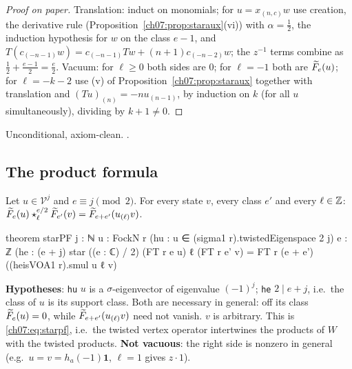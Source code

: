 \begin{proof}[Proof on paper]
Translation: induct on monomials; for $u = x_{(n,c)}w$ use creation, the derivative rule
(Proposition~\ref{ch07:prop:staraux}(vi)) with $\alpha = \frac12$, the induction hypothesis for
$w$ on the class $e-1$, and $T(c_{(-n-1)}w) = c_{(-n-1)}Tw + (n+1)c_{(-n-2)}w$; the $z^{-1}$ terms
combine as $\frac12+\frac{e-1}2 = \frac e2$. Vacuum: for $\ell\ge0$ both sides are $0$; for
$\ell = -1$ both are $\widetilde{F}_e(u)$; for $\ell = -k-2$ use (v) of
Proposition~\ref{ch07:prop:staraux} together with translation and $(Tu)_{(n)} = -nu_{(n-1)}$,
by induction on $k$ (for all $u$ simultaneously), dividing by $k+1\ne0$.
\end{proof}

\begin{status}
Unconditional, axiom-clean.
.
\end{status}

\subsection{The product formula}

\begin{theorem}\label{ch07:thm:starPF}
Let $u\in\mathcal V^j$ and $e\equiv j\pmod2$. For every state $v$, every class $e'$ and every
$\ell\in{\mathbb{Z}}$: $\widetilde{F}_e(u)\star^{e/2}_\ell\widetilde{F}_{e'}(v) = \widetilde{F}_{e+e'}(u_{(\ell)}v)$.
\end{theorem}

\begin{leancode}
theorem starPF {j : ℕ} {u : FockN r} (hu : u ∈ (sigma1 r).twistedEigenspace 2 j) {e : ℤ}
    (he : (e + j) %
    star ((e : ℂ) / 2) (FT r e u) ℓ (FT r e' v) = FT r (e + e') ((heisVOA1 r).smul u ℓ v)
\end{leancode}

\begin{dictionary}
\textbf{Hypotheses}: \verb|hu| $u$ is a $\sigma$-eigenvector of eigenvalue $(-1)^j$; \verb|he|
$2\mid e+j$, i.e.\ the class of $u$ is its support class. Both are necessary in general: off its
class $\widetilde{F}_e(u) = 0$, while $\widetilde{F}_{e+e'}(u_{(\ell)}v)$ need not vanish. $v$ is
arbitrary. This is \eqref{ch07:eq:starpf}, i.e.\ the twisted vertex operator intertwines the
products of $W$ with the twisted products. \textbf{Not vacuous}: the right side is nonzero in
general (e.g.\ $u = v = h_a(-1)\mathbf 1$, $\ell = 1$ gives $z\cdot 1$).
\end{dictionary}

